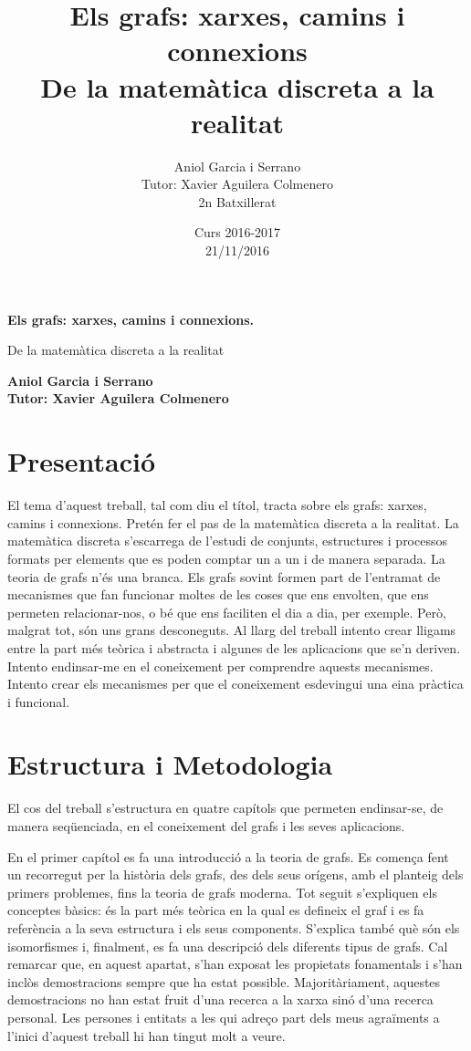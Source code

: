 \documentclass[a4, 12pt, catalan]{report}
\title{\Huge \textbf{Els grafs: xarxes, camins i connexions} \\ \LARGE De la matemàtica discreta a la realitat}
\author{\LARGE Aniol Garcia i Serrano \\ Tutor: Xavier Aguilera Colmenero\\ \small 2n Batxillerat}
\date{Curs 2016-2017 \\ 21/11/2016}
\newcounter{propietat}[subsection]
\begin{document}
\begin{center}
    \Large
    \textbf{Els grafs: xarxes, camins i connexions.}
    
    \vspace{0.1cm}
    \large
    De la matemàtica discreta a la realitat
    
    \vspace{0.3cm}
    \textbf{Aniol Garcia i Serrano \\ \small Tutor: Xavier Aguilera Colmenero}
\end{center}

\section*{Presentació}
El tema d'aquest treball, tal com diu el títol, tracta sobre els grafs: xarxes, camins i connexions. Pretén fer el pas de la matemàtica discreta a la realitat. La matemàtica discreta s'escarrega de l'estudi de conjunts, estructures i processos formats per elements que es poden comptar un a un i de manera separada. La teoria de grafs n'és una branca. Els grafs sovint formen part de l'entramat de mecanismes que fan funcionar moltes de les coses que ens envolten, que ens permeten relacionar-nos, o bé que ens faciliten el dia a dia, per exemple. Però, malgrat tot, són uns grans desconeguts. Al llarg del treball intento crear lligams entre la part més teòrica i abstracta i algunes de les aplicacions que se'n deriven. Intento endinsar-me en el coneixement per comprendre aquests mecanismes. Intento crear els mecanismes per que el coneixement esdevingui una eina pràctica i funcional. 

\section*{Estructura i Metodologia}
El cos del treball s'estructura en quatre capítols que permeten endinsar-se, de manera seqüenciada, en el coneixement del grafs i les seves aplicacions.

En el primer capítol es fa una introducció a la teoria de grafs. Es comença fent un recorregut per la història dels grafs, des dels seus orígens, amb el planteig dels primers problemes, fins la teoria de grafs moderna. Tot seguit s'expliquen els conceptes bàsics: és la part més teòrica en la qual es defineix el graf i es fa referència a la seva estructura i els seus components. S'explica també què són els isomorfismes i, finalment, es fa una descripció dels diferents tipus de grafs. Cal remarcar que, en aquest apartat, s'han exposat les propietats fonamentals i s'han inclòs demostracions  sempre que ha estat possible. Majoritàriament, aquestes demostracions no han estat fruit d'una recerca a la xarxa sinó d'una recerca personal. Les persones i entitats a les qui adreço part dels meus agraïments a l'inici d'aquest treball hi han tingut molt a veure.
\end{document}
